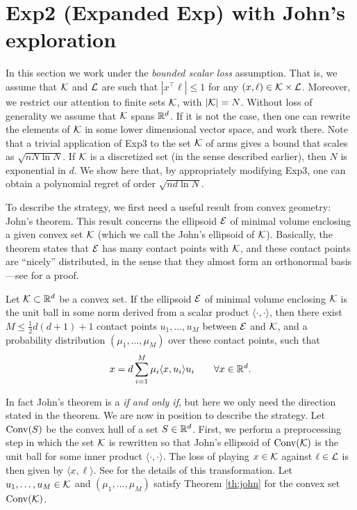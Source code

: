 \section{Exp2 (Expanded Exp) with John's exploration} \label{sec:Exp2}
In this section we work under the {\em bounded scalar loss} assumption. That is, we assume that $\mathcal{K}$ and $\mathcal{L}$ are such that $|x^{\top} \ell| \leq 1$ for any $(x, \ell) \in \mathcal{K} \times \mathcal{L}$. Moreover, we restrict our attention to finite sets $\mathcal{K}$, with $|\mathcal{K}| = N$. Without loss of generality we assume that $\mathcal{K}$ spans $\mathbb{R}^d$. If it is not the case, then one can rewrite the elements of $\mathcal{K}$ in some lower dimensional vector space, and work there. Note that a trivial application of Exp3 to the set $\mathcal{K}$ of arms gives a bound that scales as $\sqrt{n N\ln N}$. If $\mathcal{K}$ is a discretized set (in the sense described earlier), then $N$ is exponential in $d$. We show here that, by appropriately modifying Exp3, one can obtain a polynomial regret of order $\sqrt{n d \ln N}$.

To describe the strategy, we first need a useful result from convex geometry: John's theorem. This result concerns the ellipsoid $\mathcal{E}$ of minimal volume enclosing a given convex set $\mathcal{K}$ (which we call the John's ellipsoid of $\mathcal{K}$). Basically, the theorem states that $\mathcal{E}$ has many contact points with $\mathcal{K}$, and these contact points are ``nicely'' distributed, in the sense that they almost form an orthonormal basis ---see \cite{Bal97} for a proof.
\begin{theorem} \label{th:john}
Let $\mathcal{K} \subset \mathbb{R}^d$ be a convex set. If the ellipsoid $\mathcal{E}$ of minimal volume enclosing $\mathcal{K}$ is the unit ball in some norm derived from a scalar product $\langle \cdot, \cdot \rangle$, then there exist $M \leq \tfrac{1}{2}d(d+1) + 1$ contact points $u_1, \hdots, u_M$ between $\mathcal{E}$ and $\mathcal{K}$, and a probability distribution $(\mu_1,\dots,\mu_M)$ over these contact points, such that
$$x = d \sum_{i=1}^M \mu_i \langle x, u_i \rangle u_i \qquad \forall x \in \mathbb{R}^d .$$
\end{theorem}
In fact John's theorem is a {\em if and only if}, but here we only need the direction stated in the theorem. 
We are now in position to describe the strategy. Let $\mathrm{Conv}(S)$ be the convex hull of a set $S\in\mathbb{R}^d$. First, we perform a preprocessing step in which the set $\mathcal{K}$ is rewritten so that John's ellipsoid of $\mathrm{Conv}(\mathcal{K})$ is the unit ball for some inner product $\langle \cdot, \cdot \rangle$. The loss of playing $x \in \mathcal{K}$ against $\ell \in \mathcal{L}$ is then given by $\langle x, \ell \rangle$. See \cite{BCK12} for the details of this transformation. Let $u_1, \hdots, u_M \in \mathcal{K}$ and $(\mu_1,\dots,\mu_M)$ satisfy Theorem \ref{th:john} for the convex set $\mathrm{Conv}(\mathcal{K})$.

